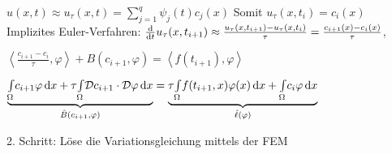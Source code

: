 \documentclass{cheat-sheet}
\newcommand{\IntOmega}[2]{\AInt{\Omega}{#1}{#2}} %
\newcommand{\DO}{\mathcal{D}} %
\newcommand{\scp}[2]{\left\langle #1 , #2 \right\rangle} %
\begin{document}
$u(x,t) \approx u_\tau(x, t) = \sum_{j=1}^q \psi_j(t) c_j(x)$
Somit $u_\tau(x, t_i) = c_i (x)$
Implizites Euler-Verfahren: $\tfrac{\mathrm{d}}{\mathrm{d} t} u_\tau(x, t_{i+1}) \approx \tfrac{u_\tau(x, t_{i+1}) - u_\tau(x, t_i)}{\tau} = \tfrac{c_{i+1}(x) - c_i(x)}{\tau}$,

$\scp{\tfrac{c_{i+1} - c_i}{\tau}}{\varphi} + B(c_{i+1}, \varphi) = \scp{f(t_{i+1})}{\varphi}$

$\underbrace{\IntOmega{c_{i+1} \varphi}{x} + \tau \IntOmega{\DO c_{i+1} \cdot \DO \varphi}{x}}_{\hat{B}(c_{i+1}, \varphi)} = \underbrace{\tau \IntOmega{f(t_{i+1}, x) \varphi(x)}{x} + \IntOmega{c_i \varphi}{x}}_{\hat{\ell}(\varphi)}$

2. Schritt: Löse die Variationsgleichung mittels der FEM
\end{document}
